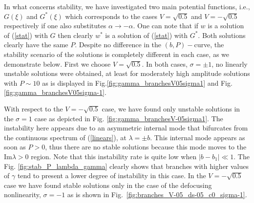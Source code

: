 \documentclass[aps,pre,showpacs,twocolumn]{revtex4}
\begin{document}
In what concerns stability, we have investigated two main potential functions, i.e., $G(\xi)$ and $G^*(\xi)$ which corresponds to the cases $V=\sqrt{0.5}$ and $V=-\sqrt{0.5}$ respectively if one also substitutes $\alpha\to -\alpha$. One can note that if $w$ is a solution of (\ref{stat}) with $G$ then clearly $w^*$ is a solution of (\ref{stat}) with $G^*$. Both solutions clearly have the same $P$. Despite no difference in the $(b,P)-$curve, the stability scenario of the solutions is completely different in each case, as we demonstrate below. First we choose $V=\sqrt{0.5}$. In both cases, $\sigma=\pm 1$,   no linearly unstable solutions were obtained, at least for moderately high amplitude solutions with $P\sim 10$ as is displayed in Fig.\ref{fig:gamma_branchesV05sigma1} and Fig. \ref{fig:gamma_branchesV05sigma-1}. 

With respect to the $V=-\sqrt{0.5}$ case, we have found only unstable solutions in the $\sigma=1$ case as depicted in Fig.  \ref{fig:gamma_branchesV-05sigma1}. The instability here appears due to an asymmetric internal mode that bifurcates from the continuous spectrum of (\ref{linears}), at $\lambda=\pm b$. This internal mode appears as soon as $P>0$, thus there are no stable solutions because this mode moves to the $\text{Im}\lambda>0$ region. Note that this instability rate is quite low when $|b-b_1|\ll 1$. The Fig.  \ref{fig:stab_P_lambda_gamma} clearly shows that branches with higher values of $\gamma$ tend to present a lower degree of instability in this case.  
In the $V=-\sqrt{0.5}$ case we have found stable solutions only in the case of the defocusing nonlinearity, $\sigma=-1$ as is shown in Fig.~\ref{fig:branches_V-05_ds-05_c0_sigma-1}.
\end{document}
